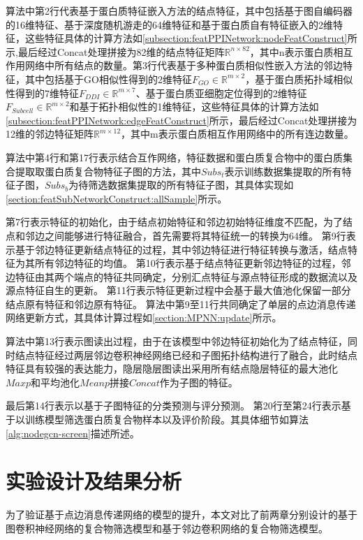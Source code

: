 算法中第2行代表基于蛋白质特征嵌入方法的结点特征，其中包括基于图自编码器的16维特征、基于深度随机游走的64维特征和基于蛋白质自有特征嵌入的2维特征，这些特征具体的计算方法如\ref{subsection:featPPINetwork:nodeFeatConstruct}所示,最后经过Concat处理拼接为82维的结点特征矩阵$\mathbb{R}^{n\times 82}$，其中n表示蛋白质相互作用网络中所有结点的数量。第3行代表基于多种蛋白质相似性嵌入方法的邻边特征，其中包括基于GO相似性得到的2维特征$F_{GO}\in \mathbb{R}^{m\times 2}$，基于蛋白质拓扑域相似性得到的7维特征$F_{DDI}\in \mathbb{R}^{m\times 7}$、基于蛋白质亚细胞定位得到的2维特征$F_{Subcell}\in \mathbb{R}^{m\times 2}$和基于拓扑相似性的1维特征，这些特征具体的计算方法如\ref{subsection:featPPINetwork:edgeFeatConstruct}所示，最后经过Concat处理拼接为12维的邻边特征矩阵$\mathbb{R}^{m\times 12}$，其中m表示蛋白质相互作用网络中的所有连边数量。

算法中第4行和第17行表示结合互作网络，特征数据和蛋白质复合物中的蛋白质集合提取取蛋白质复合物特征子图的方法，其中$Subs_t$表示训练数据集提取的所有特征子图，$Subs_b$为待筛选数据集提取的所有特征子图，其具体实现如\ref{section:featSubNetworkConstruct:allSample}所示。

第7行表示特征的初始化，由于结点初始特征和邻边初始特征维度不匹配，为了结点和邻边之间能够进行特征融合，首先需要将其特征统一的转换为64维。
第9行表示基于邻边特征更新结点特征的过程，其中邻边特征进行特征转换与激活，结点特征为其所有邻边特征的均值。
第10行表示基于结点特征更新邻边特征的过程，邻边特征由其两个端点的特征共同确定，分别汇点特征与源点特征形成的数据流以及源点特征自生的更新。
第11行表示特征更新过程中会基于最大值池化保留一部分结点原有特征和邻边原有特征。
算法中第9至11行共同确定了单层的点边消息传递网络更新方式，其具体计算过程如\ref{section:MPNN:update}所示。

算法中第13行表示图读出过程，由于在该模型中邻边特征初始化为了结点特征，同时结点特征经过两层邻边卷积神经网络已经和子图拓扑结构进行了融合，此时结点特征具有较强的表达能力，隐层隐层图读出采用所有结点隐层特征的最大池化$Maxp$和平均池化$Meanp$拼接$Concat$作为子图的特征。

最后第14行表示以基于子图特征的分类预测与评分预测。
第20行至第24行表示基于以训练模型筛选蛋白质复合物样本以及评价阶段。其具体细节如算法\ref{alg:nodegcn-screen}描述所述。

\section{实验设计及结果分析}
\label{section:MPNN:experience}
为了验证基于点边消息传递网络的模型的提升，本文对比了前两章分别设计的基于图卷积神经网络的复合物筛选模型和基于邻边卷积网络的复合物筛选模型。

